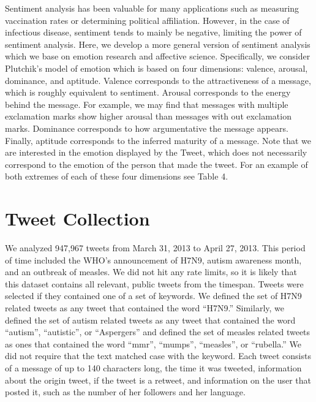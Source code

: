 Sentiment analysis has been valuable for many applications such as measuring vaccination rates \cite{salathe2011assessing} or determining political affiliation. \cite{Stieglitz2012politics} However, in the case of infectious disease, sentiment tends to mainly be negative, limiting the power of sentiment analysis. Here, we develop a more general version of sentiment analysis which we base on emotion research and affective science. \cite{Cambria2011,plutchik2001nature} Specifically, we consider Plutchik's model of emotion \cite{plutchik2001nature} which is based on four dimensions: valence, arousal, dominance, and aptitude. Valence corresponds to the attractiveness of a message, which is roughly equivalent to sentiment. Arousal corresponds to the energy behind the message. For example, we may find that messages with multiple exclamation marks show higher arousal than messages with out exclamation marks. Dominance corresponds to how argumentative the message appears.\cite{russell1977evidence} Finally, aptitude corresponds to the inferred maturity of a message.\cite{Thoits:1989va} Note that we are interested in the emotion displayed by the Tweet, which does not necessarily correspond to the emotion of the person that made the tweet. For an example of both extremes of each of these four dimensions see Table 4.

\section{Tweet Collection}
We analyzed 947,967 tweets from March 31, 2013 to April 27, 2013. This period of time included the WHO's announcement of H7N9, autism awareness month, and an outbreak of measles. We did not hit any rate limits, so it is likely that this dataset contains all relevant, public tweets from the timespan. Tweets were selected if they contained one of a set of keywords. We defined the set of H7N9 related tweets as any tweet that contained the word ``H7N9.'' Similarly, we defined the set of autism related tweets as any tweet that contained the word ``autism'', ``autistic'', or ``Aspergers'' and defined the set of measles related tweets as ones that contained the word ``mmr'', ``mumps'', ``measles'', or ``rubella.''  We did not require that the text matched case with the keyword. Each tweet consists of a message of up to 140 characters long, the time it was tweeted, information about the origin tweet, if the tweet is a retweet, and information on the user that posted it, such as the number of her followers and her language. 

